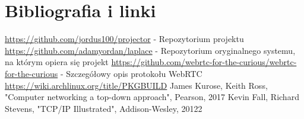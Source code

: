 \documentclass[a4paper,11pt]{article}
\begin{document}
    \section{Bibliografia i linki}
        \begin{thebibliography}{2}
         \url{https://github.com/jordus100/projector} - Repozytorium projektu
         \url{https://github.com/adamyordan/laplace} - Repozytorium oryginalnego systemu, na którym opiera się projekt
         \url{https://github.com/webrtc-for-the-curious/webrtc-for-the-curious} - Szczegółowy opis protokołu WebRTC
         \url{https://wiki.archlinux.org/title/PKGBUILD} %
         James Kurose, Keith Ross, "Computer networking a top-down approach", Pearson, 2017
         Kevin Fall, Richard Stevens, "TCP/IP Illustrated", Addison-Wesley, 20122
        \end{thebibliography}
\end{document}
